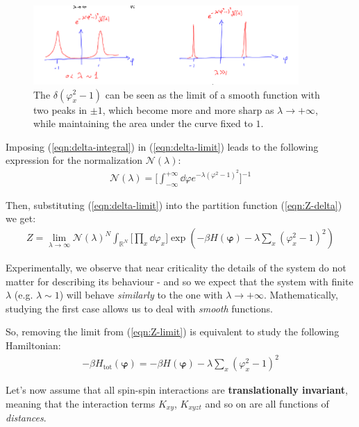 \documentclass[../../main.tex]{subfiles}
\begin{document}
\begin{figure}[H]
    \centering
    \includegraphics[width=0.9\textwidth]{delta-peaks.png}
    \caption{The $\delta(\varphi_x^2-1)$ can be seen as the limit of a smooth function with two peaks in $\pm 1$, which become more and more sharp as $\lambda \to +\infty$, while maintaining the area under the curve fixed to $1$.}
    \label{fig:delta-peaks}
\end{figure}

Imposing (\ref{eqn:delta-integral}) in (\ref{eqn:delta-limit}) leads to the following expression for the normalization $\mathcal{N}(\lambda)$:
\begin{align*}
    \mathcal{N}(\lambda) = \Big[\int_{-\infty}^{+\infty} \dd{\varphi} e^{-\lambda (\varphi^2-1)^2}\Big]^{-1}
\end{align*}

Then, substituting (\ref{eqn:delta-limit}) into the partition function (\ref{eqn:Z-delta}) we get:
\begin{align} \label{eqn:Z-limit}
    Z = \lim_{\lambda \to \infty} \mathcal{N}(\lambda)^N \int_{\mathbb{R}^N} \Big[\prod_x \dd{\varphi_x} \Big] \exp\left(-\beta H (\bm{\varphi}) - \lambda\sum_x (\varphi_x^2-1)^2 \right)
\end{align}

Experimentally, we observe that near criticality the details of the system do not matter for describing its behaviour - and so we expect that the system with finite $\lambda$ (e.g. $\lambda \sim 1$) will behave \textit{similarly} to the one with $\lambda \to +\infty$. Mathematically, studying the first case allows us to deal with \textit{smooth} functions.

\medskip

So, removing the limit from (\ref{eqn:Z-limit}) is equivalent to study the following Hamiltonian:
\begin{align*}
    -\beta H_{\mathrm{tot}}(\bm{\varphi}) = -\beta H(\bm{\varphi}) - \lambda\sum_x (\varphi_x^2 -1)^2 
\end{align*}

Let's now assume that all spin-spin interactions are \textbf{translationally invariant}, meaning that the interaction terms $K_{xy}$, $K_{xyzt}$ and so on are all functions of \textit{distances}.
\end{document}
